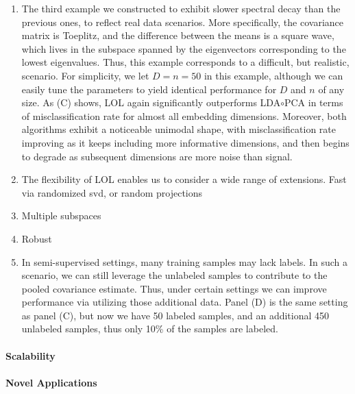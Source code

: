 \documentclass[10pt]{article}
\begin{document}
\begin{enumerate}
	\item The third example we constructed to exhibit slower spectral decay than the previous ones, to reflect real data scenarios.  More specifically, the covariance matrix is Toeplitz, and the difference between the means is a square wave, which lives in the subspace spanned by the eigenvectors corresponding to the lowest eigenvalues.  Thus, this example corresponds to a difficult, but realistic, scenario.  For simplicity, we let $D=n=50$ in this example, although we can easily tune the parameters to yield identical performance for $D$ and $n$ of any size. 	 As (C) shows, LOL again significantly outperforms LDA$\circ$PCA in terms of misclassification rate for almost all embedding dimensions.  Moreover, both algorithms exhibit a noticeable unimodal shape, with misclassification rate improving as it keeps including more informative dimensions, and then begins to degrade as subsequent dimensions are more noise than signal.  
	\item The flexibility of LOL enables us to consider a wide range of extensions. Fast via randomized svd, or random projections
	
	\item Multiple subspaces
	
	\item Robust
	
	\item  In semi-supervised settings, many training samples may lack labels.  In such a scenario, we can still leverage the unlabeled samples to contribute to the pooled covariance estimate. Thus, under certain settings \cite{Yang2011a} we can improve performance via utilizing those additional data.  Panel (D) is the same setting as panel (C), but now we have 50 labeled samples, and an additional 450 unlabeled samples, thus only 10\% of the samples are labeled.  
\end{enumerate}


\paragraph{Scalability}


\paragraph{Novel Applications}


\end{document}

